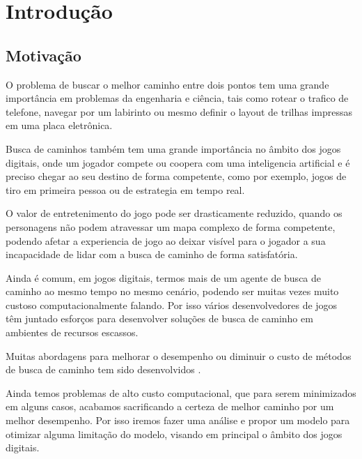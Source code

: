 
\chapter[Introdução]{Introdução}

\section{Motivação}

O problema de buscar o melhor caminho entre dois pontos tem uma grande importância em problemas da engenharia e ciência, tais como rotear o trafico de telefone, navegar por um labirinto ou mesmo definir o layout de trilhas impressas em uma placa eletrônica.

Busca de caminhos também tem uma grande importância no âmbito dos jogos digitais, onde um jogador compete ou coopera com uma inteligencia artificial e é preciso chegar ao seu destino de forma competente, como por exemplo, jogos de tiro em primeira pessoa ou de estrategia em tempo real.

O valor de entretenimento do jogo pode ser drasticamente reduzido, quando os personagens não podem atravessar um mapa complexo de forma competente, podendo afetar a experiencia de jogo ao deixar visível para o jogador a sua incapacidade de lidar com a busca de caminho de forma satisfatória.

Ainda é comum, em jogos digitais, termos mais de um agente de busca de caminho ao mesmo tempo no mesmo cenário, podendo ser muitas vezes muito custoso computacionalmente falando. Por isso vários desenvolvedores de jogos têm juntado esforços para desenvolver soluções de busca de caminho em ambientes de recursos escassos. \cite{Pontevia}


Muitas abordagens para melhorar o desempenho ou diminuir o custo de métodos de busca de caminho tem sido desenvolvidos \cite{Ulysses}  \cite{Pollack} \cite{Timothy} \cite{WilliamMiller}. 

Ainda temos problemas de alto custo computacional, que para serem minimizados em alguns casos, acabamos sacrificando a certeza de melhor caminho por um melhor desempenho\cite{Botea}. Por isso iremos fazer uma análise e propor um modelo para otimizar alguma limitação do modelo, visando em principal o âmbito dos jogos digitais.

